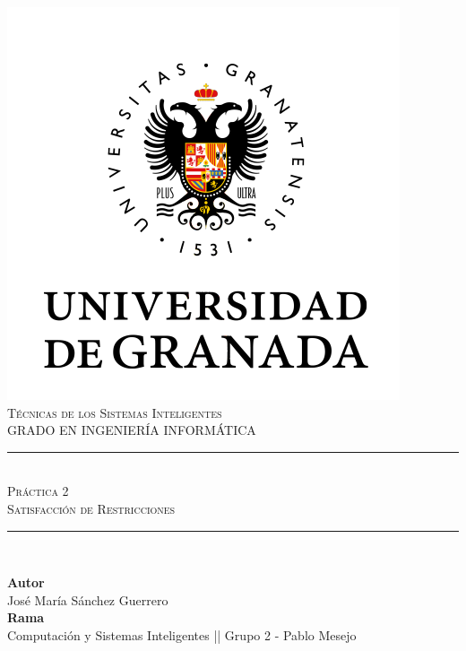 \documentclass[11pt,a4paper]{article}
\newcommand{\asignatura}{Técnicas de los Sistemas Inteligentes}
\newcommand{\autor}{José María Sánchez Guerrero}
\newcommand{\titulo}{Práctica 2}
\newcommand{\subtitulo}{Satisfacción de Restricciones}
\begin{document}

\begin{titlepage}

\begin{minipage}{\textwidth}

\centering

\includegraphics[scale=0.5]{img/ugr.png}\\

\textsc{\Large \asignatura{}\\[0.2cm]}
\textsc{GRADO EN INGENIERÍA INFORMÁTICA}\\[1cm]

\noindent\rule[-1ex]{\textwidth}{1pt}\\[1.5ex]
\textsc{{\Huge \titulo\\[0.5ex]}}
\textsc{{\Large \subtitulo\\}}
\noindent\rule[-1ex]{\textwidth}{2pt}\\[3.5ex]

\end{minipage}

\vspace{0.5cm}

\begin{minipage}{\textwidth}

\centering

\textbf{Autor}\\ {\autor{}}\\[2.5ex]
\textbf{Rama}\\ {Computación y Sistemas Inteligentes || Grupo 2 - Pablo Mesejo}\\[2.5ex]
\vspace{0.3cm}


\end{minipage}
\end{titlepage}
\end{document}
